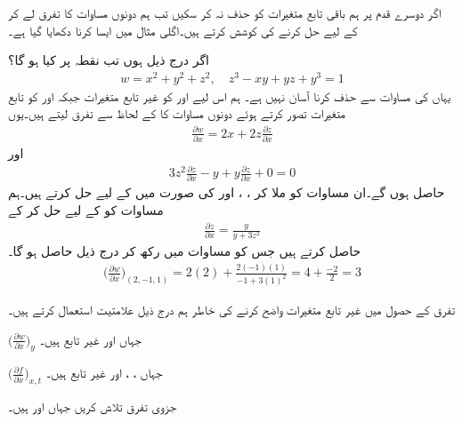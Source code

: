 اگر دوسرے قدم پر ہم باقی تابع متغیرات کو حذف نہ کر  سکیں تب  ہم  دونوں مساوات کا تفرق لے  کر      کے لیے حل کرنے کی کوشش کرتے ہیں۔اگلی مثال میں ایسا کرنا دکھایا گیا ہے۔

اگر درج ذیل ہوں تب نقطہ  پر   کیا ہو گا؟
\begin{align*}
w=x^2+y^2+z^2,\quad z^3-xy+yz+y^3=1
\end{align*}
یہاں  کی مساوات سے  حذف کرنا  آسان نہیں ہے۔ ہم اس لیے   اور  کو غیر تابع متغیرات  جبکہ  اور  کو تابع متغیرات  تصور کرتے ہوئے دونوں مساوات   کا  کے لحاظ سے تفرق لیتے ہیں۔یوں 
\begin{align}\label{مساوات_کثیرالمتغیر_اصل_الف}
\frac{\partial w}{\partial x}=2x+2z\frac{\partial z}{\partial x}
\end{align}
اور
\begin{align}\label{مساوات_کثیرالمتغیر_اصل_ب}
3z^2\frac{\partial z}{\partial x}-y+y\frac{\partial z}{\partial x}+0=0
\end{align}
حاصل ہوں گے۔ان  مساوات کو   ملا کر ،  ، اور  کی صورت میں  کے لیے حل کرتے ہیں۔ہم مساوات  کو  کے لیے حل کر  کے
\begin{align*}
\frac{\partial z}{\partial x}=\frac{y}{y+3z^2}
\end{align*}
حاصل کرتے ہیں جس کو مساوات   میں  رکھ کر  درج ذیل حاصل ہو گا۔
\begin{align*}
\big(\frac{\partial w}{\partial x}\big)_{(2,-1,1)}=2(2)+\frac{2(-1)(1)}{-1+3(1)^2}=4+\frac{-2}{2}=3
\end{align*}

تفرق کے حصول میں غیر تابع متغیرات واضح کرنے کی خاطر ہم درج ذیل علامتیت استعمال کرتے ہیں۔
\begin{description}
\item{$\big(\frac{\partial w}{\partial x}\big)_y$}\quad
{} جہاں  اور  غیر تابع ہیں۔
\item{$\big(\frac{\partial f}{\partial x}\big)_{x,t}$}\quad
{} جہاں ، ،   اور  غیر تابع ہیں۔
\end{description}

جزوی تفرق  تلاش کریں جہاں  اور  ہیں۔

